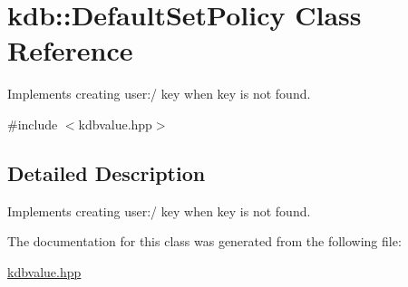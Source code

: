 \hypertarget{classkdb_1_1DefaultSetPolicy}{}\section{kdb\+:\+:Default\+Set\+Policy Class Reference}
\label{classkdb_1_1DefaultSetPolicy}


Implements creating user\+:/ key when key is not found.  




{\ttfamily \#include $<$kdbvalue.\+hpp$>$}



\subsection{Detailed Description}
Implements creating user\+:/ key when key is not found. 

The documentation for this class was generated from the following file\+:\begin{DoxyCompactItemize}
\item 
\hyperlink{kdbvalue_8hpp}{kdbvalue.\+hpp}\end{DoxyCompactItemize}
